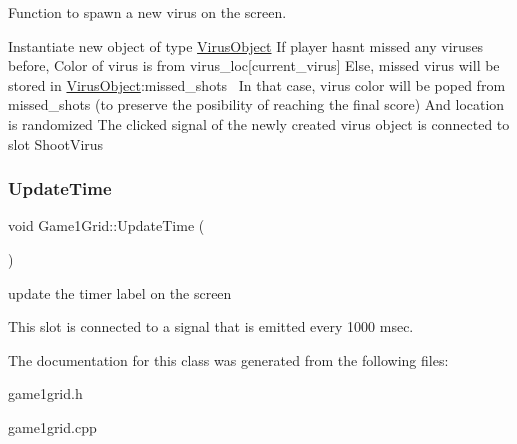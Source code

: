 Function to spawn a new virus on the screen. 

Instantiate new object of type \hyperlink{classVirusObject}{Virus\+Object} If player hasn\textquotesingle{}t missed any viruses before, Color of virus is from virus\+\_\+loc\mbox{[}current\+\_\+virus\mbox{]} Else, missed virus will be stored in \hyperlink{classVirusObject}{Virus\+Object}\+:missed\+\_\+shots~\newline
In that case, virus color will be poped from missed\+\_\+shots (to preserve the posibility of reaching the final score) And location is randomized The clicked signal of the newly created virus object is connected to slot Shoot\+Virus \mbox{\label{classGame1Grid_a7741eac6d405319474e22549b2e5a727}} 
\subsubsection{\texorpdfstring{Update\+Time}{UpdateTime}}
{\footnotesize\ttfamily void Game1\+Grid\+::\+Update\+Time (\begin{DoxyParamCaption}{ }\end{DoxyParamCaption})\hspace{0.3cm}{\ttfamily [slot]}}



update the timer label on the screen 

This slot is connected to a signal that is emitted every 1000 msec. 

The documentation for this class was generated from the following files\+:\begin{DoxyCompactItemize}
\item 
game1grid.\+h\item 
game1grid.\+cpp\end{DoxyCompactItemize}
